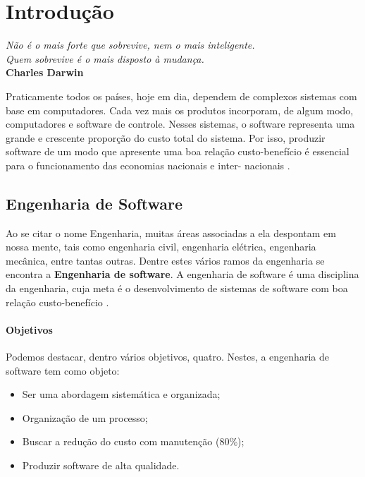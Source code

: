\setcounter{chapter}{0}
\chapter{Introdução}

\begin{flushright}
	\textit{
		Não é o mais forte que sobrevive, nem o mais inteligente. \\ Quem sobrevive é o mais disposto à mudança.
	} \\
	
	\textbf{Charles Darwin}
\end{flushright}

Praticamente todos os países, hoje em dia, dependem de complexos sistemas com base em computadores. Cada vez mais os produtos incorporam, de algum modo, computadores e software de controle. Nesses sistemas, o software representa uma grande e crescente proporção do custo total do sistema. Por isso, produzir software de um modo que apresente uma boa relação custo-benefício é essencial para o funcionamento das economias nacionais e inter- nacionais \cite{sommerville2003engenharia}.

\section{Engenharia de Software}

Ao se citar o nome Engenharia, muitas áreas associadas a ela despontam em nossa mente, tais como engenharia civil, engenharia elétrica, engenharia mecânica, entre tantas outras. Dentre estes vários ramos da engenharia se encontra a \textbf{Engenharia de software}. A engenharia de software é uma disciplina da engenharia, cuja meta é o desenvolvimento de sistemas de software com boa relação custo-benefício \cite{sommerville2003engenharia}. 

\subsubsection{Objetivos}

Podemos destacar, dentro vários objetivos, quatro. Nestes, a engenharia de software tem como objeto:

\begin{itemize}
	\item Ser uma abordagem sistemática e organizada;
	\item  Organização de um processo;
	\item Buscar a redução do custo com manutenção (80\%);
	\item Produzir software de alta qualidade.
\end{itemize}


